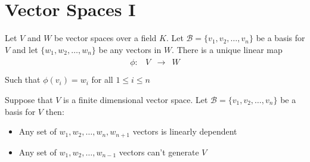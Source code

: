 \documentclass[final,expand]{problemset}
\begin{document}

\section*{Vector Spaces I}

\problem
Let $V$ and $W$ be vector spaces over a field $K$. Let $\mathcal{B} = \{v_1, v_2, \dots,
	v_n\}$ be a basis for $V$ and let $\{w_1, w_2, \dots, w_n\}$ be any
vectors in
$W$. There is a unique linear map \begin{align*}
	\begin{matrix}
		\phi: & V & \to & W \\
	\end{matrix}
\end{align*}
Such that $\phi(v_i) = w_i$ for all $1 \le i \le n$


\problem
Suppose that $V$ is a finite dimensional vector space. Let $\mathcal{B} = \{v_1, v_2, \dots, v_n\}$ be a basis for $V$ then:
\begin{itemize}
	\item Any set of $w_1, w_2, \dots, w_n, w_{n+1}$ vectors is linearly dependent
	\item Any set of $w_1, w_2, \dots, w_{n-1}$ vectors can't generate $V$
\end{itemize}
\end{document}
